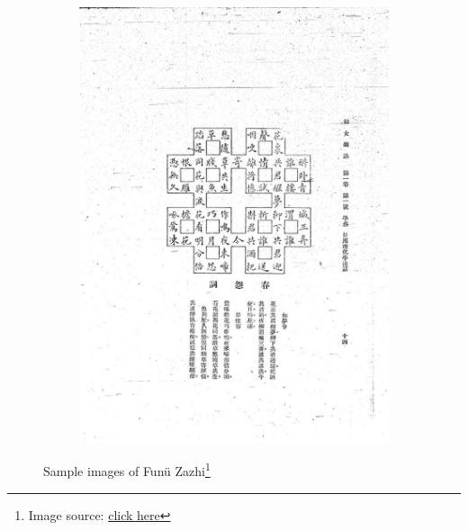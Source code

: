 \documentclass{beamer}
\begin{document}
\begin{frame}
\begin{figure}[htbp]
\begin{subfigure}[b]{0.23\linewidth}
            \includegraphics[height=1.3\linewidth]{./figures/fnzz4}
        \end{subfigure}
        \caption{Sample images of Funü Zazhi\footnote{Image source: \href{https://mhdb.mh.sinica.edu.tw/fnzz/view.php}{click here}}}
    \end{figure}
\end{frame}
\end{document}

